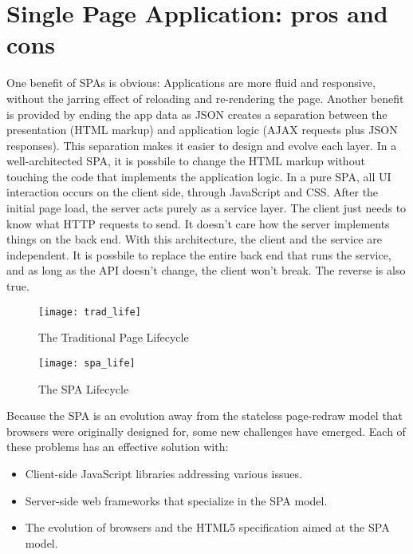 \section{Single Page Application: pros and cons}
\label{sec:ARC_overview}

One benefit of SPAs is obvious: Applications are more fluid and responsive, without the jarring effect of reloading and re-rendering the page.
Another benefit is provided by ending the app data as JSON creates a separation between the presentation (HTML markup) and application logic (AJAX requests plus JSON responses).
This separation makes it easier to design and evolve each layer. In a well-architected SPA, it is possbile to change the HTML markup without touching the code that implements the application logic.
In a pure SPA, all UI interaction occurs on the client side, through JavaScript and CSS. After the initial page load, the server acts purely as a service layer. The client just needs to know what HTTP requests to send. It doesn’t care how the server implements things on the back end.
With this architecture, the client and the service are independent. It is possbile to replace the entire back end that runs the service, and as long as the API doesn’t change, the client won’t break. The reverse is also true.

\begin {figure}[h]
\graphicspath{{images/chapter_arc/}}
\texttt{[image: trad\_life]}
\caption{The Traditional Page Lifecycle}
\end {figure}


\begin {figure}[h]
\graphicspath{{images/chapter_arc/}}
\texttt{[image: spa\_life]}
\caption{The SPA Lifecycle}
\end {figure}



Because the SPA is an evolution away from the stateless page-redraw model that browsers were originally designed for, some new challenges have emerged. Each of these problems has an effective solution with:
\begin{itemize}
\item Client-side JavaScript libraries addressing various issues.
\item Server-side web frameworks that specialize in the SPA model.
\item The evolution of browsers and the HTML5 specification aimed at the SPA model.
\end{itemize}

